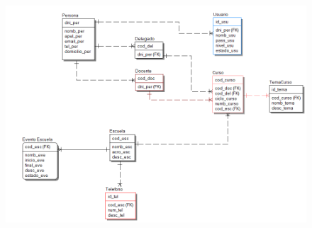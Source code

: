 \documentclass[12pt]{report}
\begin{document}
\begin{figure}[H]
	\begin{FlushLeft}		\includegraphics[width=5.94in,height=4.29in]{./media/image8.png}
	\end{FlushLeft}\end{figure}



\par
\end{document}
